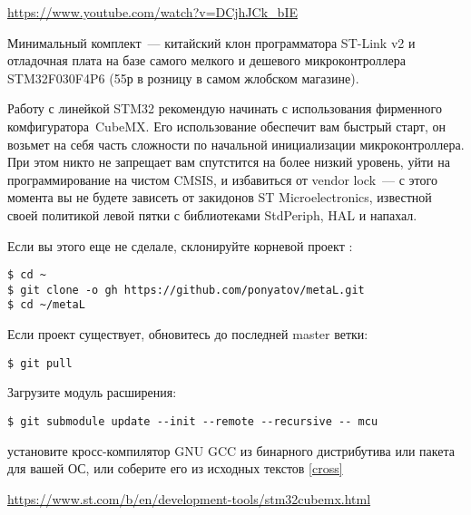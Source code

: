 \secdown

\url{https://www.youtube.com/watch?v=DCjhJCk_bIE}

\href{https://www.aliexpress.com/item/FREE-SHIPPING-ST-Link-V2-stlink-mini-STM8STM32-STLINK-simulator-download-programming-With-Cover/1814606455.html}{}
\href{https://www.aliexpress.com/item/48-MHz-STM32F030F4P6-Small-Systems-Development-Board-CORTEX-M0-Core-32bit-Mini-System-Development-Panels/32831635311.html}{}

Минимальный комплект\ --- китайский клон программатора ST-Link v2 и отладочная
плата на базе самого мелкого и дешевого микроконтроллера STM32F030F4P6 (55р в
розницу в самом жлобском магазине).

\bigskip
Работу с линейкой STM32 рекомендую начинать с использования фирменного
комфигуратора\ CubeMX.
Его использование обеспечит вам быстрый старт, он возьмет на себя часть
сложности по начальной инициализации микроконтроллера. При этом никто не
запрещает вам спутстится на более низкий уровень, уйти на программирование на
чистом CMSIS, и избавиться от vendor lock\ --- с этого момента вы не будете
зависеть от закидонов ST Microelectronics, известной своей политикой левой пятки
с библиотеками StdPeriph, HAL и напахал.


\noindent
Если вы этого еще не сделале, склонируйте корневой проект \metal:

\begin{verbatim}
$ cd ~
$ git clone -o gh https://github.com/ponyatov/metaL.git
$ cd ~/metaL
\end{verbatim}
Если проект существует, обновитесь до последней master ветки:
\begin{verbatim}
$ git pull
\end{verbatim}
Загрузите модуль расширения:
\begin{verbatim}
$ git submodule update --init --remote --recursive -- mcu
\end{verbatim}
установите кросс-компилятор GNU GCC из бинарного дистрибутива или пакета для
вашей ОС, или соберите его из исходных текстов
\ref{cross}


\url{https://www.st.com/b/en/development-tools/stm32cubemx.html}

\secup